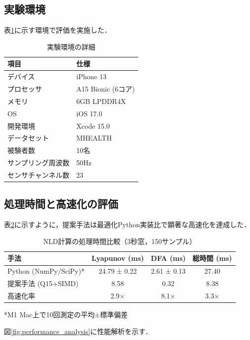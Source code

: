 \documentclass[paper]{ieice}
\begin{document}
\subsection{実験環境}

表\ref{tab:environment}に示す環境で評価を実施した．

\begin{table}[t]
\caption{実験環境の詳細}
\label{tab:environment}
\centering
\begin{tabular}{ll}
\toprule
項目 & 仕様 \\
\midrule
デバイス & iPhone 13 \\
プロセッサ & A15 Bionic (6コア) \\
メモリ & 6GB LPDDR4X \\
OS & iOS 17.0 \\
開発環境 & Xcode 15.0 \\
データセット & MHEALTH\cite{banos2014} \\
被験者数 & 10名 \\
サンプリング周波数 & 50Hz \\
センサチャンネル数 & 23 \\
\bottomrule
\end{tabular}
\end{table}

\subsection{処理時間と高速化の評価}

表\ref{tab:performance}に示すように，提案手法は最適化Python実装比で顕著な高速化を達成した．

\begin{table}[t]
\caption{NLD計算の処理時間比較（3秒窓，150サンプル）}
\label{tab:performance}
\centering
\begin{tabular}{lccc}
\toprule
手法 & Lyapunov (ms) & DFA (ms) & 総時間 (ms) \\
\midrule
Python (NumPy/SciPy)* & 24.79 ± 0.22 & 2.61 ± 0.13 & 27.40 \\
提案手法 (Q15+SIMD) & 8.58 & 0.32 & 8.38 \\
\midrule
高速化率 & 2.9× & 8.1× & 3.3× \\
\bottomrule
\end{tabular}
\vspace{1mm}
\footnotesize{*M1 Mac上で10回測定の平均±標準偏差}
\end{table}

図\ref{fig:performance_analysis}に性能解析を示す．
\end{document}

